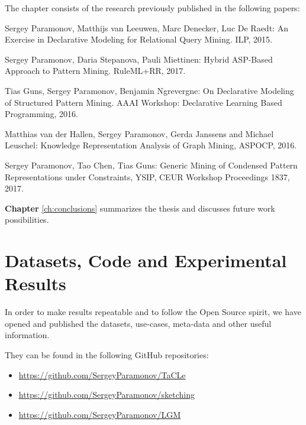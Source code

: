 The chapter consists of the research previously published in the following papers:
\begin{addmargin}[2em]{2em}
Sergey Paramonov, Matthijs van Leeuwen, Marc Denecker, Luc De Raedt:
An Exercise in Declarative Modeling for Relational Query Mining. ILP, 
2015.


Sergey Paramonov, Daria Stepanova, Pauli Miettinen:
Hybrid ASP-Based Approach to Pattern Mining. RuleML+RR, 2017.


Tias Guns, Sergey Paramonov, Benjamin Ngrevergne:  On Declarative Modeling of Structured Pattern Mining. AAAI Workshop:
  Declarative Learning Based Programming, 2016.

Matthias van der Hallen, Sergey Paramonov, Gerda Janssens and
  Michael Leuschel: Knowledge Representation Analysis of Graph
  Mining, ASPOCP, 2016.

Sergey Paramonov, Tao Chen, Tias Guns: Generic Mining of Condensed
Pattern Representations under Constraints, YSIP, CEUR Workshop
Proceedings 1837, 2017.

\end{addmargin}

\textbf{Chapter} \ref{ch:conclusions} summarizes the thesis and
discusses future work possibilities.

\section{Datasets, Code and Experimental Results}
In order to make results repeatable and to follow the Open Source
spirit, we have opened and published the datasets, use-cases,
meta-data and other useful information.

They can be found in the following GitHub repositories:
\begin{itemize}
\item \url{https://github.com/SergeyParamonov/TaCLe}
\item \url{https://github.com/SergeyParamonov/sketching}
\item \url{https://github.com/SergeyParamonov/LGM}
\end{itemize}
\cleardoublepage
